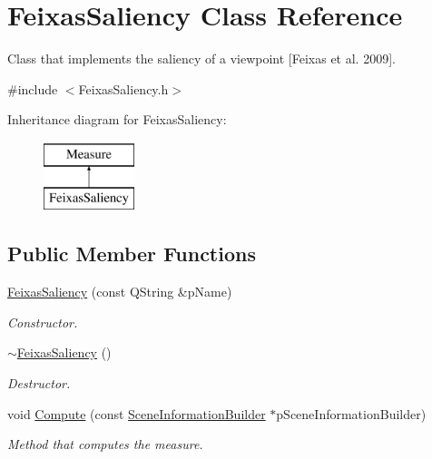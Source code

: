 \hypertarget{class_feixas_saliency}{\section{Feixas\+Saliency Class Reference}
\label{class_feixas_saliency}
}


Class that implements the saliency of a viewpoint \mbox{[}Feixas et al. 2009\mbox{]}.  




{\ttfamily \#include $<$Feixas\+Saliency.\+h$>$}

Inheritance diagram for Feixas\+Saliency\+:\begin{figure}[H]
\begin{center}
\leavevmode
\includegraphics[height=2.000000cm]{class_feixas_saliency}
\end{center}
\end{figure}
\subsection*{Public Member Functions}
\begin{DoxyCompactItemize}
\item 
\hyperlink{class_feixas_saliency_afbdd06af8664181c0ede69cacbabb5e4}{Feixas\+Saliency} (const Q\+String \&p\+Name)
\begin{DoxyCompactList}\small\item\em Constructor. \end{DoxyCompactList}\item 
\hyperlink{class_feixas_saliency_ad9ed1bf2aa1a7bca65916c2e20724e14}{$\sim$\+Feixas\+Saliency} ()
\begin{DoxyCompactList}\small\item\em Destructor. \end{DoxyCompactList}\item 
void \hyperlink{class_feixas_saliency_a86f01232be159669dc26b538c046b99c}{Compute} (const \hyperlink{class_scene_information_builder}{Scene\+Information\+Builder} $\ast$p\+Scene\+Information\+Builder)
\begin{DoxyCompactList}\small\item\em Method that computes the measure. \end{DoxyCompactList}\end{DoxyCompactItemize}
